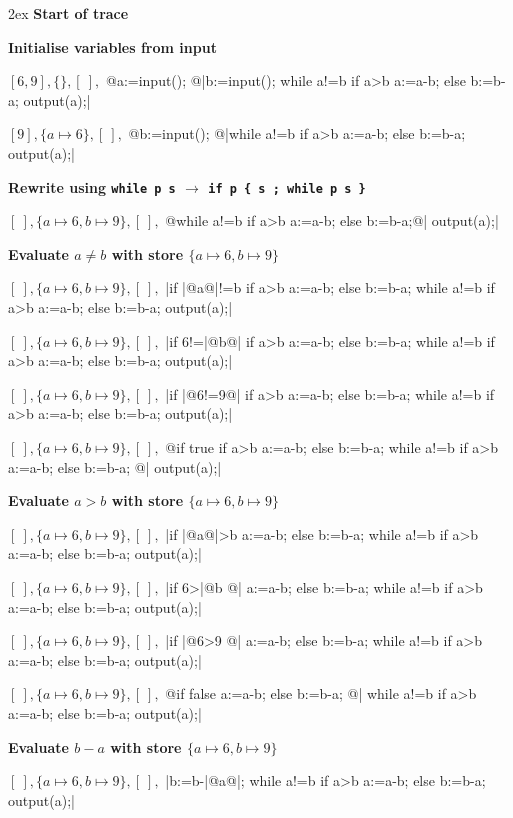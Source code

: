 \documentclass[11pt]{book}
\newcommand{\outdent}{\noindent\hspace*{-1.5cm}}
\newcommand{\outtext}[1]{{\outdent\normalsize\bf #1}}
\begin{document}
{\small\parskip2ex
\outtext{Start of trace}

\outtext{Initialise variables from input}

\outdent$  [6, 9],\{\},[\ ],$ 
@a:=input(); @|b:=input(); while a!=b if a>b a:=a-b; else b:=b-a; output(a);|$  $

\outdent$  [9],\{a \mapsto 6\},[\ ],$ 
@b:=input(); @|while a!=b if a>b a:=a-b; else b:=b-a; output(a);|$  $

\outtext{Rewrite using {\tt while p s} $\rightarrow$ {\tt if p \{ s ; while p s \}}}

\outdent$  [\ ],\{a \mapsto 6, b \mapsto 9\},[\ ],$ 
@while a!=b if a>b a:=a-b; else b:=b-a;@| output(a);|$  $

\outtext{Evaluate $ a \ne b$ with store $\{a \mapsto 6, b \mapsto 9\}$}

\outdent$  [\ ],\{a \mapsto 6, b \mapsto 9\},[\ ],$ 
|if |@a@|!=b { if a>b a:=a-b; else b:=b-a; while a!=b if a>b a:=a-b; else b:=b-a; } output(a);|$  $

\outdent$  [\ ],\{a \mapsto 6, b \mapsto 9\},[\ ],$ 
|if 6!=|@b@| { if a>b a:=a-b; else b:=b-a; while a!=b if a>b a:=a-b; else b:=b-a; } output(a);|$  $

\outdent$  [\ ],\{a \mapsto 6, b \mapsto 9\},[\ ],$ 
|if |@6!=9@| { if a>b a:=a-b; else b:=b-a; while a!=b if a>b a:=a-b; else b:=b-a; } output(a);|$  $

\outdent$  [\ ],\{a \mapsto 6, b \mapsto 9\},[\ ],$ 
@if true { if a>b a:=a-b; else b:=b-a; while a!=b if a>b a:=a-b; else b:=b-a; }@| output(a);|$  $

\outtext{Evaluate $ a > b$ with store $\{a \mapsto 6, b \mapsto 9\}$}

\outdent$  [\ ],\{a \mapsto 6, b \mapsto 9\},[\ ],$ 
|if |@a@|>b a:=a-b; else b:=b-a; while a!=b if a>b a:=a-b; else b:=b-a; output(a);|$  $
 
\outdent$  [\ ],\{a \mapsto 6, b \mapsto 9\},[\ ],$ 
|if 6>|@b @| a:=a-b; else b:=b-a; while a!=b if a>b a:=a-b; else b:=b-a; output(a);|$  $
 
\outdent$  [\ ],\{a \mapsto 6, b \mapsto 9\},[\ ],$ 
|if |@6>9 @| a:=a-b; else b:=b-a; while a!=b if a>b a:=a-b; else b:=b-a; output(a);|$  $
 
\outdent$  [\ ],\{a \mapsto 6, b \mapsto 9\},[\ ],$ 
@if false a:=a-b; else b:=b-a; @| while a!=b if a>b a:=a-b; else b:=b-a; output(a);|$  $

\outtext{Evaluate $ b-a$ with store $\{a \mapsto 6, b \mapsto 9\}$}
 
\outdent$  [\ ],\{a \mapsto 6, b \mapsto 9\},[\ ],$ 
|b:=b-|@a@|; while a!=b if a>b a:=a-b; else b:=b-a; output(a);|$  $

}
\end{document}

